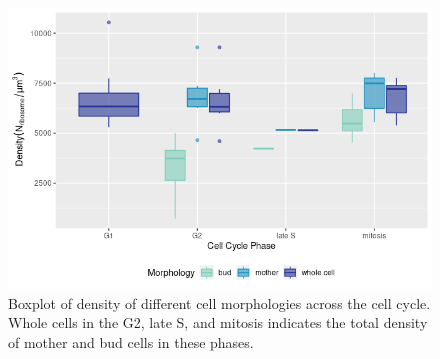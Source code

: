 
\begin{figure}[h!]
\centering
\includegraphics[width=0.8\columnwidth]{Exp_9_FCS/Figures/box_d_all}
\caption{Boxplot of density of different cell morphologies across the cell cycle. Whole cells in the G2, late S, and mitosis indicates the total density of mother and bud cells in these phases.}
\label{fig:bplot}
\end{figure}




\renewcommand{\refname}{\spacedlowsmallcaps{References}} %
%


